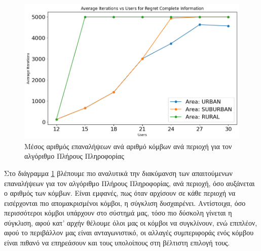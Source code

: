 \begin{figure}[ht]
    \centering
    \includegraphics[width=\textwidth]{figures/chapter4/RCI_Iterations_vs_Users_per_Area.png}
    \caption{Μέσος αριθμός επαναλήψεων ανά αριθμό κόμβων ανά περιοχή για τον αλγόριθμο Πλήρους Πληροφορίας}
    \label{fig45}
\end{figure}

Στο διάγραμμα \ref{fig45} βλέπουμε πιο αναλυτικά την διακύμανση των απαιτούμενων επαναλήψεων για τον αλγόριθμο Πλήρους Πληροφορίας, ανά περιοχή, όσο αυξάνεται ο αριθμός των κόμβων. Είναι εμφανές, πως όταν αρχίσουν σε κάθε περιοχή να εισέρχονται πιο απομακρισμένοι κόμβοι, η σύγκλιση δυσχαιρένει. Αντίστοιχα, όσο περισσότεροι κόμβοι υπάρχουν στο σύστημά μας, τόσο πιο δύσκολη γίνεται η σύγκλιση, αφού κατ' αρχήν θέλουμε όλοι μας οι κόμβοι να συγκλίνουν, ενώ επιπλέον, αφού το περιβάλλον μας είναι ανταγωνιστικό, οι αλλαγές συμπεριφοράς ενός κόμβου είναι πιθανό να επηρεάσουν και τους υπολοίπους στη βέλτιστη επιλογή τους.